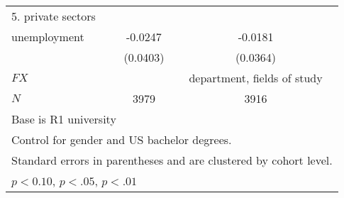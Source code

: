 \begin{table}[ht]
{\begin{tabular}{l*{2}{c}}
\hline
5. private sectors           &                     &                     \\
unemployment    &     -0.0247         &     -0.0181         \\
            &    (0.0403)         &    (0.0364)         \\
\hline
\(FX\)       &                 &        department, fields of study         \\
\(N\)       &        3979         &        3916         \\
\hline\hline
\multicolumn{3}{l}{\footnotesize Base is R1 university}\\
\multicolumn{3}{l}{\footnotesize Control for gender and US bachelor degrees.}\\
\multicolumn{3}{l}{\footnotesize Standard errors in parentheses and are clustered by cohort level.}\\
\multicolumn{3}{l}{\footnotesize \sym{*} \(p<0.10\), \sym{**} \(p<.05\), \sym{***} \(p<.01\)}\\
\end{tabular}%
}
\end{table}